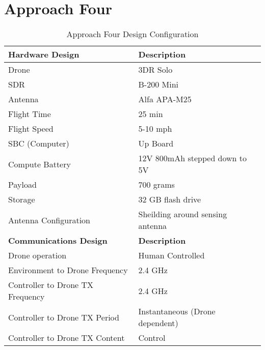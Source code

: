 \section{Approach Four}
\begin{table}[ht]
\centering
\caption{Approach Four Design Configuration}
\label{table:approach_four}
\begin{tabular}{|l|l|}
    \hline  \textbf{Hardware Design}              & \textbf{Description}                      \\ \hline
            Drone                                 & 3DR Solo                                  \\
            SDR                                   & B-200 Mini                                \\
            Antenna                               & Alfa APA-M25                              \\
            Flight Time                           & 25 min                                    \\
            Flight Speed                          & 5-10 mph                                  \\
            SBC (Computer)                        & Up Board                                  \\
            Compute Battery                       & 12V 800mAh stepped down to 5V             \\
            Payload                               & 700 grams                                 \\
            Storage                               & 32 GB flash drive                         \\
            Antenna Configuration                 & Sheilding around sensing antenna          \\
    \hline  \textbf{Communications Design}        & \textbf{Description}                      \\ \hline
            Drone operation                       & Human Controlled                          \\
            Environment to Drone Frequency        & 2.4 GHz                                   \\
            Controller to Drone TX Frequency      & 2.4 GHz                                   \\
            Controller to Drone TX Period         & Instantaneous (Drone dependent)           \\
            Controller to Drone TX Content        & Control                                   \\

\end{tabular}
\end{table}
